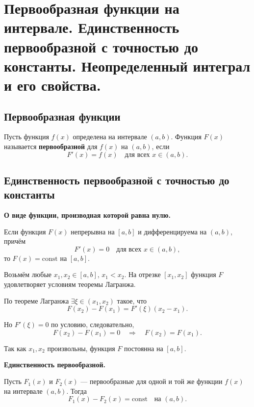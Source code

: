 \section{Первообразная функции на интервале. Единственность первообразной с точностью до константы. Неопределенный интеграл и его свойства.}

\subsection{Первообразная функции}

\begin{definition}
    Пусть функция \(f(x)\) определена на интервале \((a, b)\). 
    Функция \(F(x)\) называется \textbf{первообразной} для \(f(x)\) на \((a, b)\), если
    \[
    F'(x) = f(x) \quad \text{для всех } x \in (a, b).
    \]
\end{definition}

\subsection{Единственность первообразной с точностью до константы}

\begin{theorem}
    \textbf{О виде функции, производная которой равна нулю.}
    
    Если функция \(F(x)\) непрерывна на \([a, b]\) и дифференцируема на \((a, b)\), причём
    \[
    F'(x) = 0 \quad \text{для всех } x \in (a, b),
    \]
    то \(F(x) = \text{const}\) на \([a, b]\).
\end{theorem}

\begin{Proof}
    Возьмём любые \(x_1, x_2 \in [a, b]\), \(x_1 < x_2\). 
    На отрезке \([x_1, x_2]\) функция \(F\) удовлетворяет условиям теоремы Лагранжа.
    
    По теореме Лагранжа \(\exists \xi \in (x_1, x_2)\) такое, что
    \[
    F(x_2) - F(x_1) = F'(\xi)(x_2 - x_1).
    \]
    
    Но \(F'(\xi) = 0\) по условию, следовательно,
    \[
    F(x_2) - F(x_1) = 0 \quad \Rightarrow \quad F(x_2) = F(x_1).
    \]
    
    Так как \(x_1, x_2\) произвольны, функция \(F\) постоянна на \([a, b]\).
\end{Proof}

\begin{theorem}
    \textbf{Единственность первообразной.}
    
    Пусть \(F_1(x)\) и \(F_2(x)\) — первообразные для одной и той же функции \(f(x)\) на интервале \((a, b)\). Тогда
    \[
    F_1(x) - F_2(x) = \text{const} \quad \text{на } (a, b).
    \]
\end{theorem}

